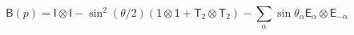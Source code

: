 \begin{equation}
\mathsf{B}(p)= \mathsf{I \otimes I} - \sin^2(\theta/2)( \mathsf{1
\otimes 1} + \mathsf{T}_2 \otimes \mathsf{T}_2) -
\sum_{\alpha}\sin\theta_{\alpha} \mathsf{E}_{\alpha} \otimes
\mathsf{E}_{-\alpha}
\end{equation}

